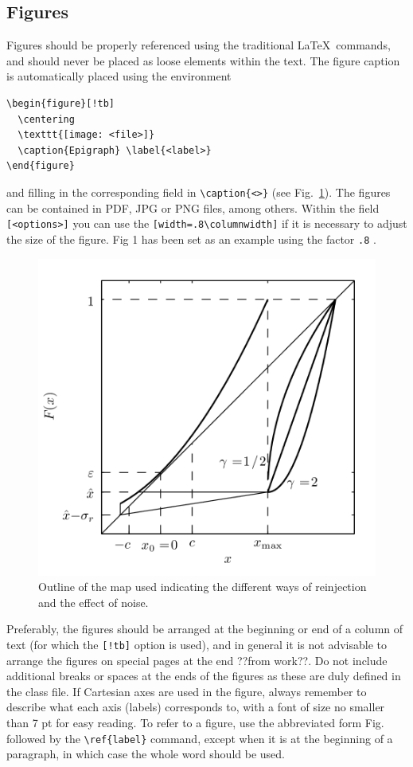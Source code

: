 \documentclass[eng]{ajceam-class}
\begin{document}
\subsection{Figures}

Figures should be properly referenced using the traditional \LaTeX\ commands, and should never be placed as loose elements within the text. The figure caption is automatically placed using the environment
\begin{verbatim}
\begin{figure}[!tb]
  \centering
  \texttt{[image: <file>]}
  \caption{Epigraph} \label{<label>}
\end{figure}
\end{verbatim}
and filling in the corresponding field in \verb!\caption{<>}! (see Fig.~\ref{fig-1}). The figures can be contained in PDF, JPG or PNG files, among others. Within the field \verb![<options>]! you can use the \verb![width=.8\columnwidth]! if it is necessary to adjust the size of the figure. Fig 1 has been set as an example using the factor \verb!.8! .

\begin{figure}[!tb] 
 \centering
 \includegraphics[width=.8\columnwidth]{figura1} 
 \caption{Outline of the map used indicating the different ways of reinjection and the effect of noise.} \label{fig-1}
\end{figure}

Preferably, the figures should be arranged at the beginning or end of a column of text (for which the \texttt{[!tb]} option is used), and in general it is not advisable to arrange the figures on special pages at the end ??from work??. Do not include additional breaks or spaces at the ends of the figures as these are duly defined in the class file. If Cartesian axes are used in the figure, always remember to describe what each axis (labels) corresponds to, with a font of size no smaller than 7 pt for easy reading. To refer to a figure, use the abbreviated form Fig. followed by the \verb!\ref{label}! command, except when it is at the beginning of a paragraph, in which case the whole word should be used.
\end{document}
